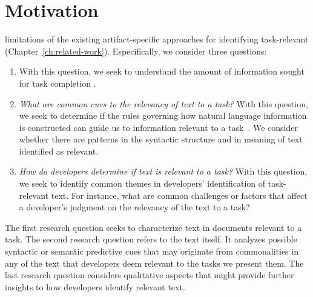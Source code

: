 \section{Motivation}
\label{cp3:method}




 limitations 
of the existing artifact-specific approaches for identifying task-relevant (Chapter~\ref{ch:related-work}). Especifically, we consider three questions:


\begin{enumerate}[label=\textit{RQ\arabic*},leftmargin=*]

    \item {} With this question, we seek to understand
    the amount of information sought for task completion
     .

    \item \textit{What are common cues to the relevancy of text to a task?}
    With this question, we seek to determine if the rules governing how natural language information
    is constructed can guide us to information relevant to a task~\cite{Kintsch1978a}.
    We consider whether there
    are patterns in the  syntactic structure and in meaning of text identified as relevant.

    \item \textit{How do developers determine if text is relevant to a task?}
    With this question, we seek to identify common themes in developers' identification of task-relevant text. For instance, what are common challenges or factors that affect a developer's judgment on the relevancy of the text to a task?

\end{enumerate}



The first research question seeks to characterize text
in documents relevant to a task.
The second research question refers to the text itself.
It analyzes possible syntactic or semantic
predictive cues that may originate from commonalities in any of the text that developers deem relevant to the tasks we present them.
The last research question considers qualitative aspects that might provide
further insights to how developers identify relevant text.

